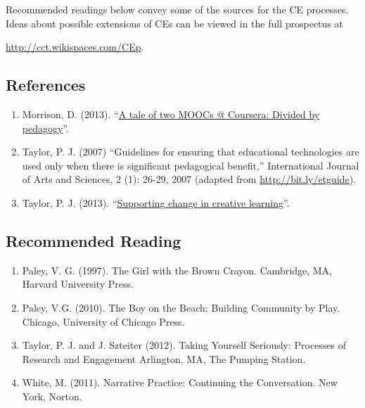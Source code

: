 \bigskip
\noindent Recommended readings below convey some of the sources for the CE
processes.~ Ideas about possible extensions of CEs can be viewed in the
full prospectus at
{\center
\url{http://cct.wikispaces.com/CEp}.\par}

\subsection{References}

\begin{enumerate}
\itemsep1pt\parskip0pt
\item
  Morrison, D. (2013). ``\href{http://bit.ly/164uqkJ}{A tale of two
  MOOCs @ Coursera: Divided by pedagogy}''.
\item
  Taylor, P. J. (2007) ``Guidelines for ensuring that educational
  technologies are used only when there is significant pedagogical
  benefit,'' International Journal of Arts and Sciences, 2 (1): 26-29,
  2007 (adapted from
  \href{http://bit.ly/etguide}{http://bit.ly/etguide}).
\item
  Taylor, P. J. (2013). ``\href{http://wp.me/p1gwfa-vv}{Supporting
  change in creative learning}''.
\end{enumerate}

\subsection{Recommended Reading}

\begin{enumerate}
\itemsep1pt\parskip0pt
\item
  Paley, V. G. (1997). The Girl with the Brown Crayon. Cambridge, MA,
  Harvard University Press.
\item
  Paley, V.G. (2010). The Boy on the Beach: Building Community by Play.
  Chicago, University of Chicago Press.
\item
  Taylor, P. J. and J. Szteiter (2012). Taking Yourself Seriously:
  Processes of Research and Engagement Arlington, MA, The Pumping
  Station.
\item
  White, M. (2011). Narrative Practice: Continuing the Conversation. New
  York, Norton.
\end{enumerate}

